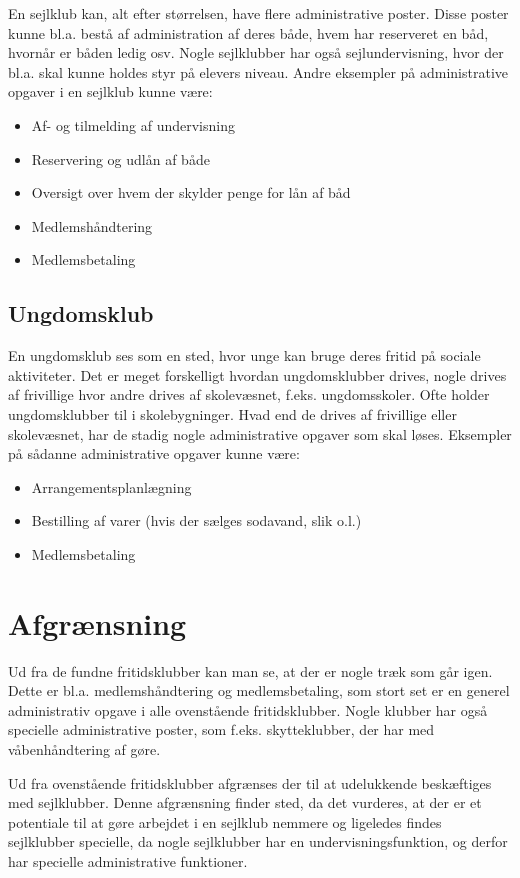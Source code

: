 En sejlklub kan, alt efter størrelsen, have flere administrative poster. Disse poster kunne bl.a. bestå af
administration af deres både, hvem har reserveret en båd, hvornår er båden ledig osv. Nogle sejlklubber har også
sejlundervisning, hvor der bl.a. skal kunne holdes styr på elevers niveau. Andre eksempler på administrative opgaver i
en sejlklub kunne være:

\begin{itemize}
\item Af- og tilmelding af undervisning
\item Reservering og udlån af både
\item Oversigt over hvem der skylder penge for lån af båd
\item Medlemshåndtering
\item Medlemsbetaling
\end{itemize}

\subsection{Ungdomsklub}

En ungdomsklub ses som en sted, hvor unge kan bruge deres fritid på sociale aktiviteter. Det er meget forskelligt
hvordan ungdomsklubber drives, nogle drives af frivillige hvor andre drives af skolevæsnet, f.eks. ungdomsskoler. Ofte
holder ungdomsklubber til i skolebygninger. Hvad end de drives af frivillige eller skolevæsnet, har de stadig nogle
administrative opgaver som skal løses. Eksempler på sådanne administrative opgaver kunne være:

\begin{itemize}
\item Arrangementsplanlægning
\item Bestilling af varer (hvis der sælges sodavand, slik o.l.)
\item Medlemsbetaling
\end{itemize}

\section{Afgrænsning}

Ud fra de fundne fritidsklubber kan man se, at der er nogle træk som går igen. Dette er bl.a. medlemshåndtering og
medlemsbetaling, som stort set er en generel administrativ opgave i alle ovenstående fritidsklubber. Nogle klubber har
også specielle administrative poster, som f.eks. skytteklubber, der har med våbenhåndtering af gøre.

Ud fra ovenstående fritidsklubber afgrænses der til at udelukkende beskæftiges med sejlklubber. Denne afgrænsning finder
sted, da det vurderes, at der er et potentiale til at gøre arbejdet i en sejlklub nemmere og ligeledes findes
sejlklubber specielle, da nogle sejlklubber har en undervisningsfunktion, og derfor har specielle administrative
funktioner.

